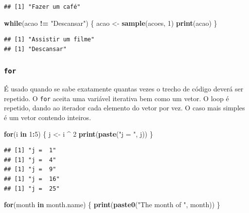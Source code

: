 \documentclass[
]{book}
\newenvironment{Shaded}{\begin{snugshade}}{\end{snugshade}}
\newcommand{\ControlFlowTok}[1]{\textcolor[rgb]{0.13,0.29,0.53}{\textbf{#1}}}
\newcommand{\DecValTok}[1]{\textcolor[rgb]{0.00,0.00,0.81}{#1}}
\newcommand{\FunctionTok}[1]{\textcolor[rgb]{0.13,0.29,0.53}{\textbf{#1}}}
\newcommand{\NormalTok}[1]{#1}
\newcommand{\OtherTok}[1]{\textcolor[rgb]{0.56,0.35,0.01}{#1}}
\newcommand{\SpecialCharTok}[1]{\textcolor[rgb]{0.81,0.36,0.00}{\textbf{#1}}}
\newcommand{\StringTok}[1]{\textcolor[rgb]{0.31,0.60,0.02}{#1}}
\begin{document}
\begin{verbatim}
## [1] "Fazer um café"
\end{verbatim}

\begin{Shaded}
\begin{Highlighting}[]
\ControlFlowTok{while}\NormalTok{(acao }\SpecialCharTok{!=} \StringTok{"Descansar"}\NormalTok{) \{}
\NormalTok{  acao }\OtherTok{\textless{}{-}} \FunctionTok{sample}\NormalTok{(acoes, }\DecValTok{1}\NormalTok{)}
  \FunctionTok{print}\NormalTok{(acao)}
\NormalTok{\}}
\end{Highlighting}
\end{Shaded}

\begin{verbatim}
## [1] "Assistir um filme"
## [1] "Descansar"
\end{verbatim}

\subsubsection{\texorpdfstring{\texttt{for}}{for}}\label{for}

É usado quando se sabe exatamente quantas vezes o trecho de código deverá ser repetido.
O \texttt{for} aceita uma variável iterativa bem como um vetor.
O loop é repetido, dando ao iterador cada elemento do vetor por vez.
O caso mais simples é um vetor contendo inteiros.

\begin{Shaded}
\begin{Highlighting}[]
\ControlFlowTok{for}\NormalTok{(i }\ControlFlowTok{in} \DecValTok{1}\SpecialCharTok{:}\DecValTok{5}\NormalTok{) \{}
\NormalTok{  j }\OtherTok{\textless{}{-}}\NormalTok{ i }\SpecialCharTok{\^{}} \DecValTok{2}
  \FunctionTok{print}\NormalTok{(}\FunctionTok{paste}\NormalTok{(}\StringTok{"j = "}\NormalTok{, j))}
\NormalTok{\}}
\end{Highlighting}
\end{Shaded}

\begin{verbatim}
## [1] "j =  1"
## [1] "j =  4"
## [1] "j =  9"
## [1] "j =  16"
## [1] "j =  25"
\end{verbatim}

\begin{Shaded}
\begin{Highlighting}[]
\ControlFlowTok{for}\NormalTok{(month }\ControlFlowTok{in}\NormalTok{ month.name)}
\NormalTok{\{}
 \FunctionTok{print}\NormalTok{(}\FunctionTok{paste0}\NormalTok{(}\StringTok{"The month of "}\NormalTok{, month))}
\NormalTok{\}}
\end{Highlighting}
\end{Shaded}
\end{document}
